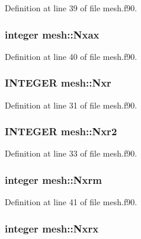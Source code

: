 Definition at line 39 of file mesh.f90.

\hypertarget{namespacemesh_a258a6753e659f5aad4d77626f82c674c}{
\subsubsection[{Nxax}]{\setlength{\rightskip}{0pt plus 5cm}integer {\bf mesh::Nxax}}}
\label{namespacemesh_a258a6753e659f5aad4d77626f82c674c}


Definition at line 40 of file mesh.f90.

\hypertarget{namespacemesh_a4fae0f9e86bfdcb8fec5dc0aefd8fe71}{
\subsubsection[{Nxr}]{\setlength{\rightskip}{0pt plus 5cm}INTEGER {\bf mesh::Nxr}}}
\label{namespacemesh_a4fae0f9e86bfdcb8fec5dc0aefd8fe71}


Definition at line 31 of file mesh.f90.

\hypertarget{namespacemesh_a7838433bd66eb8c9d5155928904d9a5a}{
\subsubsection[{Nxr2}]{\setlength{\rightskip}{0pt plus 5cm}INTEGER {\bf mesh::Nxr2}}}
\label{namespacemesh_a7838433bd66eb8c9d5155928904d9a5a}


Definition at line 33 of file mesh.f90.

\hypertarget{namespacemesh_a3dc98a3a965cb38fc45c4b7801f0f3d2}{
\subsubsection[{Nxrm}]{\setlength{\rightskip}{0pt plus 5cm}integer {\bf mesh::Nxrm}}}
\label{namespacemesh_a3dc98a3a965cb38fc45c4b7801f0f3d2}


Definition at line 41 of file mesh.f90.

\hypertarget{namespacemesh_a3836bb9dd0f99e784aecf5ffac36418a}{
\subsubsection[{Nxrx}]{\setlength{\rightskip}{0pt plus 5cm}integer {\bf mesh::Nxrx}}}
\label{namespacemesh_a3836bb9dd0f99e784aecf5ffac36418a}


